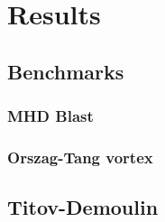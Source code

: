 \chapter{Results}

\section{Benchmarks}

\subsection{MHD Blast}

\subsection{Orszag-Tang vortex}

\section{Titov-Demoulin}
